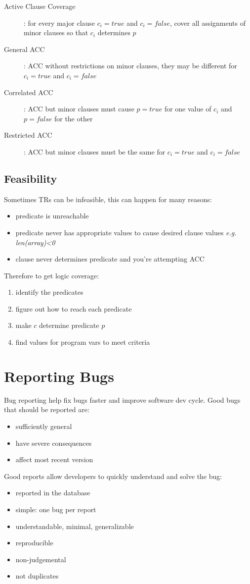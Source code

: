 \documentclass[]{article}
\theoremstyle{definition}
\begin{document}
	\begin{description}
		\item[Active Clause Coverage]: for every major clause $c_i = true$ and $c_i = false$, cover all assignments of minor clauses so that $c_i$ determines $p$ 
		\item[General ACC]: ACC without restrictions on minor clauses, they may be different for $c_i = true$ and $c_i = false$
		\item[Correlated ACC]: ACC but minor clauses must cause $p = true$ for one value of $c_i$ and $p = false$ for the other
		\item[Restricted ACC]: ACC but minor clauses must be the same for $c_i = true$ and $c_i = false$
	\end{description}
	\subsection{Feasibility}
	Sometimes TRs can be infeasible, this can happen for many reasons:
	\begin{itemize}
		\item predicate is unreachable
		\item predicate never has appropriate values to cause desired clause values \textit{e.g. len(array)<0} 
		\item clause never determines predicate and you're attempting ACC
	\end{itemize}
	Therefore to get logic coverage:
	\begin{enumerate}
		\item identify the predicates 
		\item figure out how to reach each predicate
		\item make $c$ determine predicate $p$
		\item find values for program vars to meet criteria
	\end{enumerate}

	\section{Reporting Bugs}
	Bug reporting help fix bugs faster and improve software dev cycle. Good bugs that should be reported are:
	\begin{itemize}
		\item sufficiently general
		\item have severe consequences
		\item affect most recent version
	\end{itemize}
	Good reports allow developers to quickly understand and solve the bug:
	\begin{itemize}
		\item reported in the database
		\item simple: one bug per report
		\item understandable, minimal, generalizable
		\item reproducible
		\item non-judgemental
		\item not duplicates
	\end{itemize}
\end{document}
